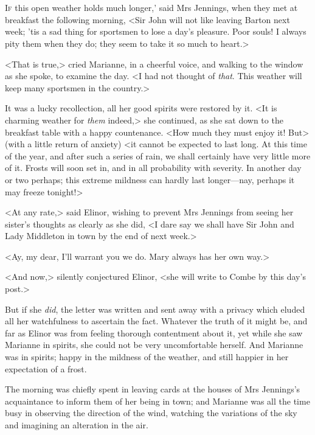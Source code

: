 \chapter[Chapter \thechapter]{}
	\lettrine[ante=`, lraise=0.3]{I}{f} this open weather holds much longer,' said Mrs Jennings, when they met at breakfast the following morning, <Sir John will not like leaving Barton next week; 'tis a sad thing for sportsmen to lose a day's pleasure. Poor souls! I always pity them when they do; they seem to take it so much to heart.>

<That is true,> cried Marianne, in a cheerful voice, and walking to the window as she spoke, to examine the day. <I had not thought of \textit{that}. This weather will keep many sportsmen in the country.>

It was a lucky recollection, all her good spirits were restored by it. <It is charming weather for \textit{them} indeed,> she continued, as she sat down to the breakfast table with a happy countenance. <How much they must enjoy it! But> (with a little return of anxiety) <it cannot be expected to last long. At this time of the year, and after such a series of rain, we shall certainly have very little more of it. Frosts will soon set in, and in all probability with severity. In another day or two perhaps; this extreme mildness can hardly last longer—nay, perhaps it may freeze tonight!>

<At any rate,> said Elinor, wishing to prevent Mrs Jennings from seeing her sister's thoughts as clearly as she did, <I dare say we shall have Sir John and Lady Middleton in town by the end of next week.>

<Ay, my dear, I'll warrant you we do. Mary always has her own way.>

<And now,> silently conjectured Elinor, <she will write to Combe by this day's post.>

But if she \textit{did}, the letter was written and sent away with a privacy which eluded all her watchfulness to ascertain the fact. Whatever the truth of it might be, and far as Elinor was from feeling thorough contentment about it, yet while she saw Marianne in spirits, she could not be very uncomfortable herself. And Marianne was in spirits; happy in the mildness of the weather, and still happier in her expectation of a frost.

The morning was chiefly spent in leaving cards at the houses of Mrs Jennings's acquaintance to inform them of her being in town; and Marianne was all the time busy in observing the direction of the wind, watching the variations of the sky and imagining an alteration in the air.

